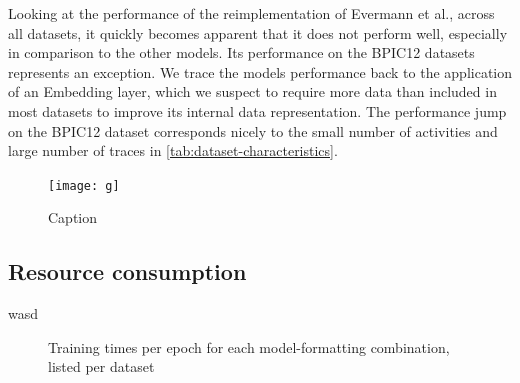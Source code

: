 Looking at the performance of the reimplementation of Evermann et al., across all datasets, it quickly becomes apparent that it does not perform well, especially in comparison to the other models. Its performance on the BPIC12 datasets represents an exception. We trace the models performance back to the application of an Embedding layer, which we suspect to require more data than included in most datasets to improve its internal data representation. The performance jump on the BPIC12 dataset corresponds nicely to the small number of activities and large number of traces in \autoref{tab:dataset-characteristics}.

\begin{figure}
    \centering
    \texttt{[image: g]}
    \caption{Caption}
    \label{fig:my_label}
\end{figure}



\FloatBarrier
\subsection*{Resource consumption}
wasd
\begin{figure}[!htb]
    \centering
    \qquad
    \qquad
    
    \caption{Training times per epoch for each model-formatting combination, listed per dataset}
    \label{fig:training-timings}
\end{figure}

